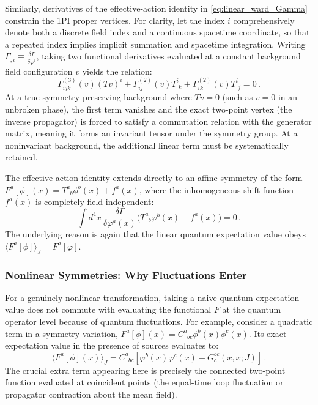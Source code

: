 Similarly, derivatives of the effective-action identity in \eqref{eq:linear_ward_Gamma} constrain the 1PI proper vertices. For clarity, let the index \(i\) comprehensively denote both a discrete field index and a continuous spacetime coordinate, so that a repeated index implies implicit summation and spacetime integration. Writing \(\Gamma_{,i} \equiv \frac{\delta \Gamma}{\delta \varphi^i}\), taking two functional derivatives evaluated at a constant background field configuration \(v\) yields the relation:
\begin{equation} \label{eq:three_point_vertex_ward}
    \Gamma^{(3)}_{ijk}(v) (T v)^i + \Gamma^{(2)}_{ij}(v) T^i_{\phantom{i}k} + \Gamma^{(2)}_{ik}(v) T^i_{\phantom{i}j} = 0 \, .
\end{equation}
At a true symmetry-preserving background where \(Tv = 0\) (such as \(v = 0\) in an unbroken phase), the first term vanishes and the exact two-point vertex (the inverse propagator) is forced to satisfy a commutation relation with the generator matrix, meaning it forms an invariant tensor under the symmetry group. At a noninvariant background, the additional linear term must be systematically retained.

The effective-action identity extends directly to an affine symmetry of the form \(F^a[\phi](x) = T^a_{\phantom{a}b}\phi^b(x) + f^a(x)\), where the inhomogeneous shift function \(f^a(x)\) is completely field-independent:
\begin{equation} \label{eq:affine_ward_Gamma}
    \int d^4x \, \frac{\delta \Gamma}{\delta \varphi^a(x)} \Big( T^a_{\phantom{a}b}\varphi^b(x) + f^a(x) \Big) = 0 \, .
\end{equation}
The underlying reason is again that the linear quantum expectation value obeys \(\langle F^a[\phi] \rangle_J = F^a[\varphi]\).

\subsubsection{Nonlinear Symmetries: Why Fluctuations Enter}

For a genuinely nonlinear transformation, taking a naive quantum expectation value does not commute with evaluating the functional \(F\) at the quantum operator level because of quantum fluctuations. For example, consider a quadratic term in a symmetry variation, \(F^a[\phi](x) = C^a_{\phantom{a}bc}\phi^b(x)\phi^c(x)\). Its exact expectation value in the presence of sources evaluates to:
\begin{equation} \label{eq:nonlinear_expectation_value}
    \langle F^a[\phi](x) \rangle_J = C^a_{\phantom{a}bc} \left[ \varphi^b(x)\varphi^c(x) + G_c^{bc}(x, x; J) \right] \, .
\end{equation}
The crucial extra term appearing here is precisely the connected two-point function evaluated at coincident points (the equal-time loop fluctuation or propagator contraction about the mean field).

